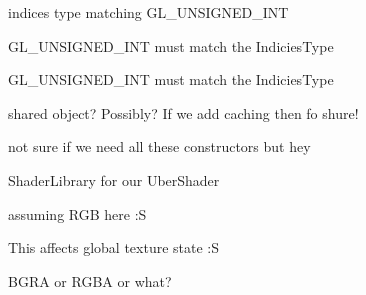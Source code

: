 \begin{DoxyRefList}
indices type matching G\-L\-\_\-\-U\-N\-S\-I\-G\-N\-E\-D\-\_\-\-I\-N\-T  
\item[\label{todo__todo000025}%
\hypertarget{todo__todo000025}{}%
Member \hyperlink{classs9_1_1gl_1_1Drawable_a82268b69a4127ccea73e20d14e9a4835}{s9\-:\-:gl\-:\-:Drawable\-:\-:set\-Pointers} (Geometry\-T$<$ Vertex4, Face4, Allocation\-Policy $>$ \&g, Brew\-Flags b)]G\-L\-\_\-\-U\-N\-S\-I\-G\-N\-E\-D\-\_\-\-I\-N\-T must match the Indicies\-Type  
\item[\label{todo__todo000026}%
\hypertarget{todo__todo000026}{}%
Member \hyperlink{classs9_1_1gl_1_1Drawable_ad1e1197c103a410e4a606dfda9e6810d}{s9\-:\-:gl\-:\-:Drawable\-:\-:set\-Pointers} (Geometry\-T$<$ Vertex3, Face3, Allocation\-Policy $>$ \&g, Brew\-Flags b)]G\-L\-\_\-\-U\-N\-S\-I\-G\-N\-E\-D\-\_\-\-I\-N\-T must match the Indicies\-Type  
\item[\label{todo__todo000028}%
\hypertarget{todo__todo000028}{}%
Member \hyperlink{classs9_1_1gl_1_1Shader_ae78a7518cbf2dace65cdef8d9ed07721}{s9\-:\-:gl\-:\-:Shader\-:\-:Shader} ()]shared object? Possibly? If we add caching then fo shure!  
\item[\label{todo__todo000029}%
\hypertarget{todo__todo000029}{}%
Member \hyperlink{classs9_1_1gl_1_1Shader_a5639704a27519dd9bba2faf9e3e6af34}{s9\-:\-:gl\-:\-:Shader\-:\-:Shader} (\hyperlink{classs9_1_1File}{s9\-::\-File} glsl)]not sure if we need all these constructors but hey  
\item[\label{todo__todo000027}%
\hypertarget{todo__todo000027}{}%
Class \hyperlink{structs9_1_1gl_1_1ShaderClause}{s9\-:\-:gl\-:\-:Shader\-Clause$<$ T $>$} ]Shader\-Library for our Uber\-Shader  
\item[\label{todo__todo000001}%
\hypertarget{todo__todo000001}{}%
Member \hyperlink{classs9_1_1gl_1_1Texture_a169bf6c0f7958eee33cf1d60ba0c7806}{s9\-:\-:gl\-:\-:Texture\-:\-:Texture} (const Image \&image)]assuming R\-G\-B here \-:S 

This affects global texture state \-:S 

B\-G\-R\-A or R\-G\-B\-A or what? 


\end{DoxyRefList}
